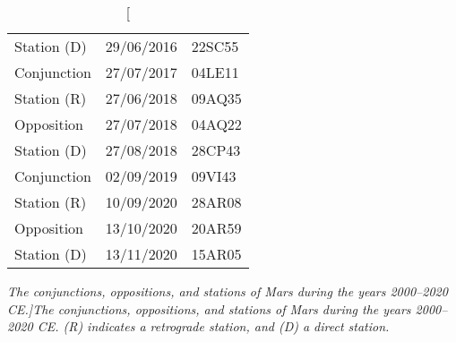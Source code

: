 \begin{table}
\begin{tabular}{lcl}
Station (D) & 29/06/2016 & 22SC55\\
Conjunction & 27/07/2017 & 04LE11\\
Station (R) & 27/06/2018 & 09AQ35\\
Opposition & 27/07/2018 & 04AQ22\\
Station (D) & 27/08/2018 & 28CP43\\
Conjunction & 02/09/2019 & 09VI43\\
Station (R) & 10/09/2020 & 28AR08\\
Opposition & 13/10/2020 & 20AR59\\
Station (D) & 13/11/2020 & 15AR05\\
\end{tabular}
\caption[\em The conjunctions, oppositions, and stations of Mars
during the years 2000--2020 CE.]{\em The conjunctions, oppositions, and stations of Mars
during the years 2000--2020 CE. (R) indicates a retrograde station, and (D)
a direct station.}\label{vtmars}
\end{table}

